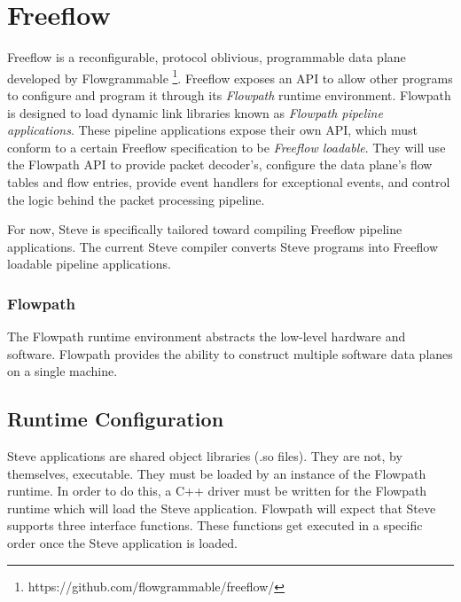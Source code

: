 \chapter{Freeflow} \label{ch:flowpath}

Freeflow is a reconfigurable, protocol oblivious, programmable data plane developed by Flowgrammable \footnote{https://github.com/flowgrammable/freeflow/}. Freeflow exposes an API to allow other programs to configure and program it through its \textit{Flowpath} runtime environment. Flowpath is designed to load dynamic link libraries known as \textit{Flowpath pipeline applications}. These pipeline applications expose their own API, which must conform to a certain Freeflow specification to be \textit{Freeflow loadable}. 
They will use the Flowpath API to provide packet decoder's, configure the data plane's flow tables and flow entries, provide event handlers for exceptional events, and control the logic behind the packet processing pipeline.

For now, Steve is specifically tailored toward compiling Freeflow pipeline applications. The current Steve compiler converts Steve programs into Freeflow loadable pipeline applications. 

\subsection{Flowpath}

The Flowpath runtime environment abstracts the low-level hardware and software. Flowpath provides the ability to construct multiple software data planes on a single machine.

\section{Runtime Configuration} \label{config_guide}

Steve applications are shared object libraries (.so files). They are not, by themselves, executable. They must be loaded by an instance of the Flowpath runtime. In order to do this, a C++ driver must be written for the Flowpath runtime which will load the Steve application. Flowpath will expect that Steve supports three interface functions. These functions get executed in a specific order once the Steve application is loaded.


